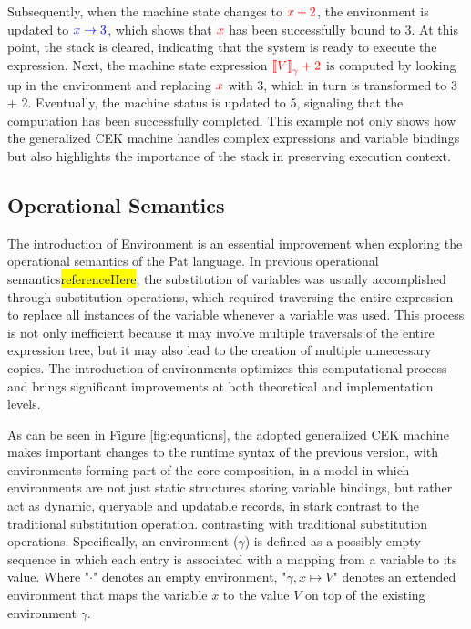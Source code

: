 \documentclass{l4proj}
\begin{document}
Subsequently, when the machine state changes to $\color{red}x + 2$, the environment is updated to $\color{blue}x \rightarrow 3$, which shows that $\color{red}x$ has been successfully bound to {\color{red}3}. At this point, the stack is cleared, indicating that the system is ready to execute the expression. Next, the machine state expression $\color{red}\text{\textlbrackdbl} V \text{\textrbrackdbl}_{\gamma} + 2$ is computed by looking up in the environment and replacing $\color{red}x$ with {\color{red}3}, which in turn is transformed to {\color{red}3} + {\color{red}2}. Eventually, the machine status is updated to {\color{red}5}, signaling that the computation has been successfully completed. This example not only shows how the generalized CEK machine handles complex expressions and variable bindings but also highlights the importance of the stack in preserving execution context. 

\subsection{Operational Semantics}

The introduction of Environment is an essential improvement when exploring the operational semantics of the Pat language. In previous operational semantics\colorbox{yellow}{referenceHere}, the substitution of variables was usually accomplished through substitution operations, which required traversing the entire expression to replace all instances of the variable whenever a variable was used. This process is not only inefficient because it may involve multiple traversals of the entire expression tree, but it may also lead to the creation of multiple unnecessary copies. The introduction of environments optimizes this computational process and brings significant improvements at both theoretical and implementation levels.

As can be seen in Figure \ref{fig:equations}, the adopted generalized CEK machine makes important changes to the runtime syntax of the previous version, with environments forming part of the core composition, in a model in which environments are not just static structures storing variable bindings, but rather act as dynamic, queryable and updatable records, in stark contrast to the traditional substitution operation. contrasting with traditional substitution operations. Specifically, an environment ($\gamma$) is defined as a possibly empty sequence in which each entry is associated with a mapping from a variable to its value. Where "$\cdot$" denotes an empty environment, "$\gamma, x \mapsto V$" denotes an extended environment that maps the variable $x$ to the value $V$ on top of the existing environment $\gamma$.
\end{document}
